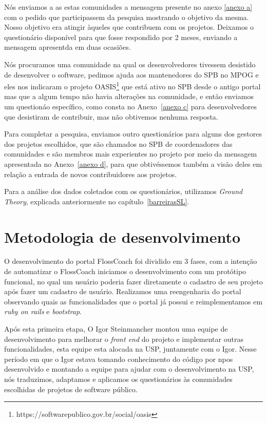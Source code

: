 Nós enviamos a as estas comunidades a mensagem presente no anexo \ref{anexo a}
com o pedido que participassem da pesquisa mostrando o objetivo da mesma. Nosso objetivo 
era atingir àqueles que contribuem com os projetos. Deixamos o questionário disponível 
para que fosse respondido por 2 meses, enviando a mensagem apresentda em duas ocasiões.

Nós procuramos uma comunidade na qual os desenvolvedores tivessem desistido
de desenvolver o software, pedimos ajuda aos mantenedores do SPB no MPOG e eles nos 
indicaram o projeto OASIS\footnote{https://softwarepublico.gov.br/social/oasis} que 
está ativo no SPB desde o antigo portal mas que a algum tempo não havia alterações
na comunidade, e então enviamos um questionáo específico, como consta no Anexo~\ref{anexo c} 
para desenvolvedores que desistiram de contribuir, mas não obtivemos nenhuma resposta. 

Para completar a pesquisa, enviamos outro questionários para alguns dos gestores dos
projetos escolhidos, que são chamados no SPB de coordenadores das comunidades e 
são membros mais experientes no projeto por meio da mensagem apresentada no Anexo~\ref{anexo d}, 
para que obtivéssemos também a visão deles em relação a entrada de novos contribuidores aos projetos. 

Para a análise dos dados coletados com os questionários, utilizamos \textit{Ground Theory}, 
explicada anteriormente no capítulo~\ref{barreirasSL}.

\section{Metodologia de desenvolvimento}

O desenvolvimento do portal FlossCoach foi dividido em 3 fases, com a intenção de 
automatizar o FlossCoach iniciamos o desenvolvimento com um protótipo funcional, no qual 
um usuário poderia fazer diretamente o cadastro de seu projeto após fazer um cadastro de 
usuário. Realizamos uma reengenharia do portal observando quais as funcionalidades 
que o portal já possui e reimplementamos em \textit{ruby on rails} e \textit{bootstrap}.

Após esta primeira etapa, O Igor Steinmancher montou uma equipe de desenvolvimento 
para melhorar o \textit{front end} do projeto e implementar outras funcionalidades, 
esta equipe esta alocada na USP, juntamente com o Igor. Nesse período em que o Igor 
estava tomando conhecimento do código por npos desenvolvido e montando a equipe para
ajudar com o desenvolvimento na USP, nós traduzimos, adaptamos e aplicamos os questionários
às comunidades escolhidas de projetos de software público.

